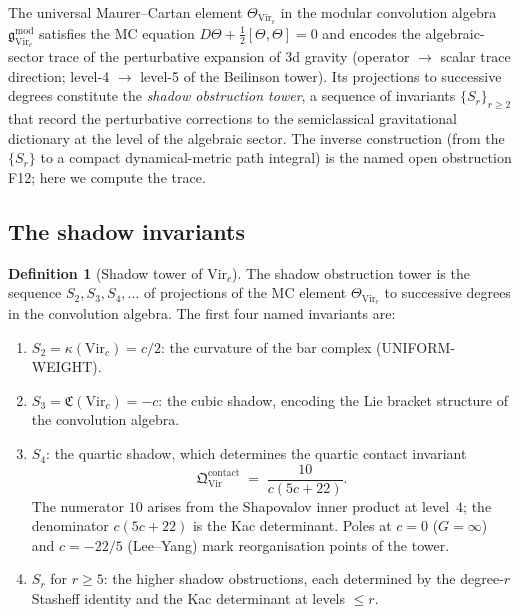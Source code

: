 \documentclass[11pt,reqno]{amsart}
\theoremstyle{definition}
\newtheorem{definition}[theorem]{Definition}
\theoremstyle{remark}
\begin{document}
The universal Maurer--Cartan element $\Theta_{\mathrm{Vir}_c}$ in
the modular convolution algebra
$\mathfrak{g}^{\mathrm{mod}}_{\mathrm{Vir}_c}$ satisfies the MC
equation $D\Theta + \frac{1}{2}[\Theta, \Theta] = 0$ and encodes
the algebraic-sector trace of the perturbative expansion of 3d
gravity (operator $\to$ scalar trace direction; level-4 $\to$
level-5 of the Beilinson tower). Its projections to successive
degrees constitute the \emph{shadow obstruction tower}, a sequence
of invariants $\{S_r\}_{r \ge 2}$ that record the perturbative
corrections to the semiclassical gravitational dictionary at the
level of the algebraic sector. The inverse construction (from the
$\{S_r\}$ to a compact dynamical-metric path integral) is the
named open obstruction F12; here we compute the trace.

\subsection{The shadow invariants}

\begin{definition}[Shadow tower of $\mathrm{Vir}_c$]
\label{def:shadow-tower}
The shadow obstruction tower is the sequence
$S_2, S_3, S_4, \ldots$ of projections of the MC element
$\Theta_{\mathrm{Vir}_c}$ to successive degrees in the convolution
algebra. The first four named invariants are:
\begin{enumerate}[label=(\roman*)]
\item $S_2 = \kappa(\mathrm{Vir}_c) = c/2$: the curvature of the
  bar complex (UNIFORM-WEIGHT).
\item $S_3 = \mathfrak{C}(\mathrm{Vir}_c) = -c$: the cubic shadow,
  encoding the Lie bracket structure of the convolution algebra.
\item $S_4$: the quartic shadow, which determines the quartic contact
  invariant
  \begin{equation}\label{eq:quartic-contact}
  \mathfrak{Q}^{\mathrm{contact}}_{\mathrm{Vir}}
  \;=\;
  \frac{10}{c(5c+22)}.
  \end{equation}
  The numerator $10$ arises from the Shapovalov inner product at
  level~$4$; the denominator $c(5c+22)$ is the Kac determinant.
  Poles at $c = 0$ ($G = \infty$) and $c = -22/5$ (Lee--Yang)
  mark reorganisation points of the tower.
\item $S_r$ for $r \ge 5$: the higher shadow obstructions, each
  determined by the degree-$r$ Stasheff identity and the Kac
  determinant at levels $\le r$.
\end{enumerate}
\end{definition}
\end{document}
